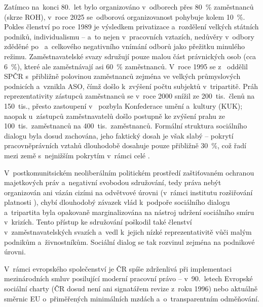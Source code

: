 Zatímco na~konci 80.~let bylo organizováno v~odborech přes \SI{80}{\percent} zaměstnanců (skrze \ac{ROH}), v~roce 2025 se~odborová organizovanost pohybuje kolem \SI{10}{\percent}.
Pokles členství po roce 1989 je výsledkem privatizace a~rozdělení velkých státních podniků, individualismu -- a~to nejen v~pracovních vztazích, nedůvěry v~odbory zděděné po~ a~celkového negativního vnímání odborů jako přežitku minulého režimu.
Zaměstnavatelské svazy sdružují pouze malou část právnických osob (cca \SI{6}{\percent}), které ale zaměstnávají asi \SI{60}{\percent} zaměstnanců.
V~roce 1995 se z~ oddělil \ac{SPČR} s~přibližně polovinou zaměstnanců zejména ve velkých průmyslových podnicích a~vznikla \ac{ASO}, čímž došlo k~zvýšení počtu subjektů v~tripartitě. Práh reprezentativity zástupců zaměstnanců se v~roce 2000 snížil ze 200~tis.~členů na 150~tis., přesto zastoupení v~ pozbyla Konfederace umění a~kultury (KUK); naopak u~zástupců zaměstnavatelů došlo postupně ke zvýšení prahu ze 100~tis.~zaměstnanců na 400~tis.~zaměstnanců.
Formální struktura sociálního dialogu byla dosud zachována, jeho faktický dosah je však slabý -- pokrytí pracovněprávních vztahů  dlouhodobě dosahuje pouze přibližně \SI{30}{\percent}, což  řadí mezi země s~nejnižším pokrytím v~rámci celé .\par
V~postkomunitsickém neoliberálním politickém prostředí zaštiťovaném ochranou majetkových práv a~negativní svobodou sdružování, tedy práva nebýt organizován ani vázán cizími  na odvětvové úrovni (v~rámci institutu rozšiřování platnosti ), chybí dlouhodobý závazek vlád k~podpoře sociálního dialogu a~tripartita byla opakovaně marginalizována na nástroj udržení sociálního smíru v~krizích.
Tento přístup ke sdružování poškodil také členství v~zaměstnavatelských svazích a~vedl k~jejich nízké reprezentativitě vůči malým podnikům a~živnostníkům. Sociální dialog se tak rozvinul zejména na podnikové úrovni.\par
V~rámci evropského společenství je \acl{ČR} spíše zdrženlivá při implementaci mezinárodních smluv posilující moderní pracovní právo -- v~90.~letech Evropské sociální charty (\acs{ČR} dosud není ani signatářem revize z~roku 1996) nebo aktuálně směrnic \acs{EU} o~přiměřených minimálních mzdách a~o~transparentním odměňování.\par

